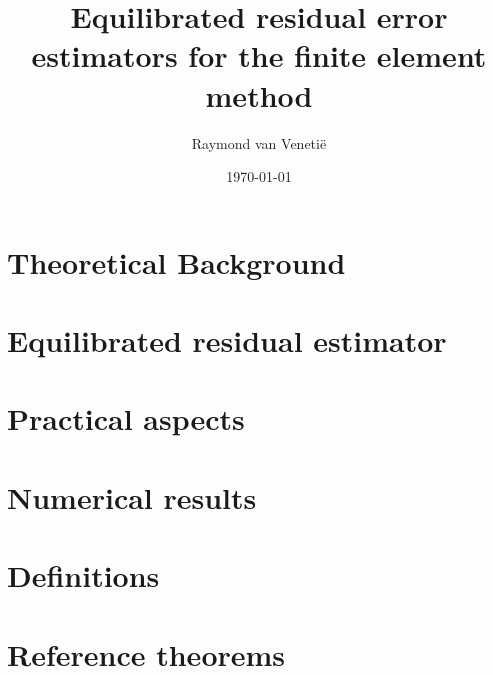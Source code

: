 \documentclass{uvamath}
\title{Equilibrated residual error estimators for the finite element method} %
\author[raymond.van.venetie@gmail.com, 10004627]{Raymond van Veneti\"e} %
\date{\today} %
\theoremstyle{plain}%
\theoremstyle{definition}
\theoremstyle{remark}
\newcommand{\1}{\mathds{1}}
\begin{document}
\maketitle
\begin{abstract}
  
\end{abstract}

\tableofcontents

%

\chapter{Theoretical Background}


\chapter{Equilibrated residual estimator}


\chapter{Practical aspects}


\chapter{Numerical results}


\begin{appendices}

\chapter{Definitions}

\chapter{Reference theorems}

\end{appendices}





\end{document}
